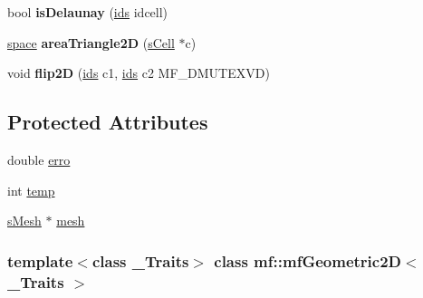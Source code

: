 \begin{DoxyCompactItemize}
\item 
\hypertarget{classmf_1_1mfGeometric2D_abc39bb3dee7dd484c87f6b0f5f3043f1}{
bool {\bfseries isDelaunay} (\hyperlink{classmf_1_1mfGeometric2D_a1a86a0d9076b7362d928c25126d18b7b}{ids} idcell)}
\label{classmf_1_1mfGeometric2D_abc39bb3dee7dd484c87f6b0f5f3043f1}

\item 
\hypertarget{classmf_1_1mfGeometric2D_a5b660ce9368f0438925a08e3865b87ae}{
\hyperlink{classmf_1_1mfGeometric2D_a6e4fccf14c9c28a5be638f0254b5af07}{space} {\bfseries areaTriangle2D} (\hyperlink{classmf_1_1mfGeometric2D_a545916ef70ee88b8be647a8950e2bc4f}{sCell} $\ast$c)}
\label{classmf_1_1mfGeometric2D_a5b660ce9368f0438925a08e3865b87ae}

\item 
\hypertarget{classmf_1_1mfGeometric2D_ae7646274e139293af8107e87e4edf7bc}{
void {\bfseries flip2D} (\hyperlink{classmf_1_1mfGeometric2D_a1a86a0d9076b7362d928c25126d18b7b}{ids} c1, \hyperlink{classmf_1_1mfGeometric2D_a1a86a0d9076b7362d928c25126d18b7b}{ids} c2 MF\_\-DMUTEXVD)}
\label{classmf_1_1mfGeometric2D_ae7646274e139293af8107e87e4edf7bc}

\end{DoxyCompactItemize}
\subsection*{Protected Attributes}
\begin{DoxyCompactItemize}
\item 
double \hyperlink{classmf_1_1mfGeometric2D_a0aafeb91782dbf312e6c4edb1d24958c}{erro}
\item 
int \hyperlink{classmf_1_1mfGeometric2D_a8fb3dcfd6e088127cdbed83a82bc525f}{temp}
\item 
\hyperlink{classmf_1_1mfGeometric2D_a5d9ae6b14eb6f0bad24d9a38567a9466}{sMesh} $\ast$ \hyperlink{classmf_1_1mfGeometric2D_a67a3149e81f236edf5f9739cc994eb36}{mesh}
\end{DoxyCompactItemize}
\subsubsection*{template$<$class \_\-Traits$>$ class mf::mfGeometric2D$<$ \_\-Traits $>$}



